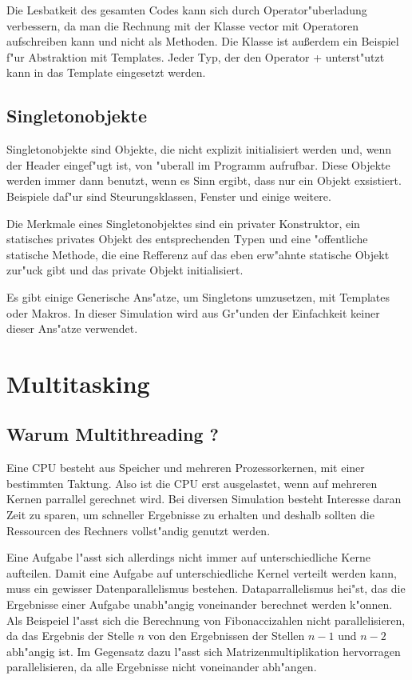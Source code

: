 \documentclass[14pt, a4paper]{report}
\begin{document}
Die Lesbatkeit des gesamten Codes kann sich durch Operator"uberladung verbessern, da man
die Rechnung mit der Klasse vector mit Operatoren aufschreiben kann und nicht als 
Methoden. Die Klasse ist außerdem ein Beispiel f"ur Abstraktion mit Templates. Jeder
Typ, der den Operator + unterst"utzt kann in das Template eingesetzt werden.

\section{Singletonobjekte}
Singletonobjekte sind Objekte, die nicht explizit initialisiert werden und, wenn der 
Header eingef"ugt ist, von "uberall im Programm aufrufbar. Diese Objekte werden immer
dann benutzt, wenn es Sinn ergibt, dass nur ein Objekt exsistiert. Beispiele daf"ur
sind Steurungsklassen, Fenster und einige weitere.

Die Merkmale eines Singletonobjektes sind ein privater Konstruktor, ein statisches 
privates Objekt des entsprechenden Typen und eine "offentliche statische Methode, die 
eine Refferenz auf das eben erw"ahnte statische Objekt zur"uck gibt und das private
Objekt initialisiert.

Es gibt einige Generische Ans"atze, um Singletons umzusetzen, mit Templates oder Makros.
In dieser Simulation wird aus Gr"unden der Einfachkeit keiner dieser Ans"atze verwendet.

\chapter{Multitasking}
\section{Warum Multithreading ?}
Eine CPU besteht aus Speicher und mehreren Prozessorkernen, mit einer bestimmten
Taktung. Also ist die CPU erst ausgelastet, wenn auf mehreren Kernen parrallel
gerechnet wird. Bei diversen Simulation besteht Interesse daran Zeit zu sparen, um
schneller Ergebnisse zu erhalten und deshalb sollten die Ressourcen des Rechners 
vollst"andig genutzt werden.

Eine Aufgabe l"asst sich allerdings nicht immer auf unterschiedliche Kerne aufteilen.
Damit eine Aufgabe auf unterschiedliche Kernel verteilt werden kann, muss ein gewisser
Datenparallelismus bestehen. Dataparrallelismus hei"st, das die Ergebnisse einer Aufgabe
unabh"angig voneinander berechnet werden k"onnen. Als Beispeiel l"asst sich die
Berechnung von Fibonaccizahlen nicht parallelisieren, da das Ergebnis der Stelle $n$ von
den Ergebnissen der Stellen $n-1$ und $n-2$ abh"angig ist. Im Gegensatz dazu l"asst sich
Matrizenmultiplikation hervorragen parallelisieren, da alle Ergebnisse nicht voneinander
abh"angen.
\end{document}
